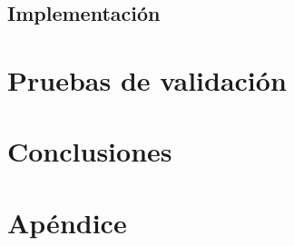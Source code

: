 \documentclass[11pt,a4paper]{book}
\begin{document}
\section{Implementación}


\chapter{Pruebas de validación}


\chapter{Conclusiones}


\printbibliography

\appendix
\chapter{Apéndice}

\end{document}
